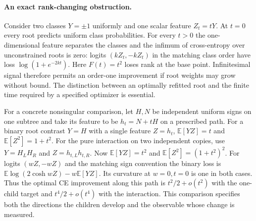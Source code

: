 \paragraph{An exact rank-changing obstruction.}
Consider two classes $Y=\pm1$ uniformly and one scalar feature $Z_t=tY$.
At $t=0$ every root predicts uniform class probabilities. For every $t>0$
the one-dimensional feature separates the classes and the infimum of
cross-entropy over unconstrained roots is zero: logits $(kZ_t,-kZ_t)$
in the matching class order have loss $\log(1+e^{-2kt})$.
Here $F(t)=t^2$ loses rank at the base point. Infinitesimal signal
therefore permits an order-one improvement if root weights may grow
without bound. The distinction between an optimally refitted root and
the finite time required by a specified optimizer is essential.

For a concrete nonsingular comparison, let $H,N$ be independent uniform
signs on one subtree and take its feature to be $h_t=N+tH$ on a prescribed
path. For a binary root contrast $Y=H$ with a single feature $Z=h_t$,
$\mathbb E[YZ]=t$ and $\mathbb E[Z^2]=1+t^2$. For the pure interaction
on two independent copies, use $Y=H_LH_R$ and $Z=h_{t,L}h_{t,R}$.
Now $\mathbb E[YZ]=t^2$ and $\mathbb E[Z^2]=(1+t^2)^2$.
For logits $(wZ,-wZ)$ and the matching sign convention the binary loss is
$\mathbb E\log(2\cosh wZ)-w\mathbb E[YZ]$.
Its curvature at $w=0,t=0$ is one in both cases. Thus the optimal CE
improvement along this path is $t^2/2+o(t^2)$ with the one-child target
and $t^4/2+o(t^4)$ with the interaction. This comparison specifies both
the directions the children develop and the observable whose change
is measured.
